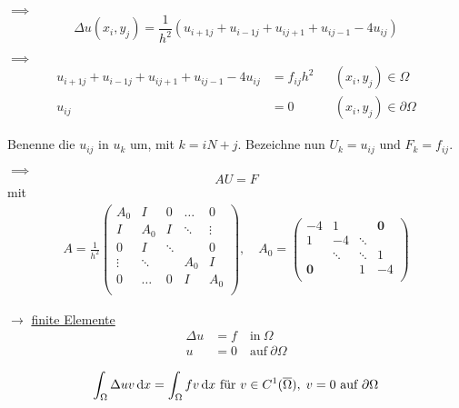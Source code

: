 $\implies$
\begin{equation*}
	\Delta u(x_i,y_j) = \frac{1}{h^2} \left( u_{i+1 j} + u_{i-1 j} + u_{i j+1} + u_{i j-1} - 4u_{i j} \right)
\end{equation*}

$\implies$
\begin{align*}
	 u_{i+1 j} + u_{i-1 j} + u_{i j+1} + u_{i j-1} - 4u_{i j} &= f_{i j}h^2 & & (x_i,y_j) \in \Omega\\
	 u_{i j} &= 0 & & (x_i,y_j) \in \partial\Omega 
\end{align*}

Benenne die $u_{ij}$ in $u_k$ um, mit $k = iN+j$. Bezeichne nun $U_k = u_{ij}$ und $F_k = f_{ij} $.

$\implies$
\begin{equation*}
	AU = F 
\end{equation*}
mit 
\begin{align*}
	A = \frac{1}{h^2}
	\begin{pmatrix}
	A_0       & I        & 0		&\dots  & 0     \\
	I		  & A_0 	 & I 		&\ddots & \vdots\\
	0		  & I        & \ddots 	&		& 0     \\
	\vdots    & \ddots   & 		  	& A_0	&	I   \\
	0		  & \dots 	 & 0  		& I 	& A_0   \\
	\end{pmatrix}, 
	\quad
	A_0 = 
	\begin{pmatrix}
	-4    		& 1      & 		  & \textbf{0}  \\
	1	  		& -4 	 & \ddots & 			\\
		  		& \ddots & \ddots &	1   \\
	\textbf{0}	& 	     & 1 	  & -4   \\
	\end{pmatrix}
\end{align*}


$\rightarrow$ \underline{finite Elemente}\enter
\enter
\begin{align*}
\Delta u &= f \quad  \text{in}\  \Omega\\
u &= 0 \quad \text{auf}\ \partial\Omega
\end{align*}

\begin{equation*}
	\int_\Omega \Delta u v \mathop{}\!\mathrm{d} x = \int_\Omega fv \mathop{}\!\mathrm{d} x \text { f\"ur } v\in C^1(\overline{\Omega}), \; v=0 \text{ auf } \partial \Omega
\end{equation*}

